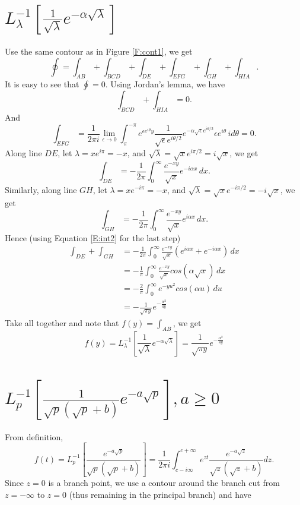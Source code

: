\section{$ L_{\lambda}^{-1}[ 
  \frac{1}{\sqrt{\lambda}} e^{-\alpha \sqrt{\lambda}} ] $ }
Use the same contour as in Figure \ref{F:cont1}, we get
\[
  \oint = \int_{AB} + \int_{BCD} + \int_{DE} + \int_{EFG} + \int_{GH}
          + \int_{HIA}.
\]
It is easy to see that $\oint=0$. Using Jordan's lemma, we have
\[
  \int_{BCD} + \int_{HIA} = 0.
\]
And
\[
  \int_{EFG} = \frac{1}{2\pi i} \lim_{\epsilon \to 0} 
    \int_{\pi}^{-\pi} e^{\epsilon e^{i\theta} y}
    \frac{1}{\sqrt{\epsilon} e^{i\theta/2}}
    e^{-\alpha \sqrt{\epsilon} e^{i\theta/2}}
    \epsilon e^{i\theta} \, i d\theta
  = 0. 
\]
Along line $DE$, let $\lambda=x e^{i\pi}=-x$, and 
$\sqrt{\lambda}=\sqrt{x} e^{i\pi/2}=i\sqrt{x}$, we get
\[
  \int_{DE} = -\frac{1}{2\pi} \int_0^{\infty} \frac{e^{-xy}}{\sqrt{x}}
              e^{-i\alpha x} \, dx.
\]
Similarly, along line $GH$, let $\lambda=x e^{-i\pi}=-x$, and 
$\sqrt{\lambda}=\sqrt{x} e^{-i\pi/2}=-i\sqrt{x}$, we get
\[
  \int_{GH} = -\frac{1}{2\pi} \int_0^{\infty} \frac{e^{-xy}}{\sqrt{x}}
              e^{i\alpha x} \, dx.
\]
Hence (using Equation \ref{E:int2} for the last step)
\begin{align*}
  \int_{DE} + \int_{GH} 
    &= -\frac{1}{2\pi} \int_0^{\infty} \frac{e^{-xy}}{\sqrt{x}}
       \left( e^{i\alpha x} + e^{-i\alpha x} \right) \, dx \\
    &= -\frac{1}{\pi} \int_0^{\infty} \frac{e^{-xy}}{\sqrt{x}}
         cos(\alpha \sqrt{x}) \, dx   \\
    &= - \frac{2}{\pi} \int_0^{\infty} e^{-yu^2} cos(\alpha u) \, du  \\
    &= - \frac{1}{\sqrt{\pi y}} e^{-\frac{\alpha^2}{4y}}
\end{align*}
Take all together and note that $f(y)=\int_{AB}$, we get
\begin{equation} \label{E:ilt2}
  f(y) = L_{\lambda}^{-1} 
         \left[ 
           \frac{1}{\sqrt{\lambda}} e^{-\alpha \sqrt{\lambda}}
         \right]
    = \frac{1}{\sqrt{\pi y}} e^{ -\frac{\alpha^2}{4y} } 
\end{equation}


\section{ $ L_p^{-1} [ \frac{1}{\sqrt{p}(\sqrt{p}+b)} e^{-a\sqrt{p}} ], a\ge 0 $ }
From definition, 
\[
	f(t)= L_p^{-1}\left[ \frac{e^{-a\sqrt{p}}}{\sqrt{p}(\sqrt{p}+b)} \right]
	    = \frac{1}{2\pi i} 
			  \int_{c-i\infty}^{c+\infty} 
				e^{zt} \frac{e^{-a\sqrt{z}}}{\sqrt{z}(\sqrt{z}+b)} dz.
\]
Since $z=0$ is a branch point, we use a contour around the branch cut from
$z=-\infty$ to $z=0$ (thus remaining in the principal branch) and have


